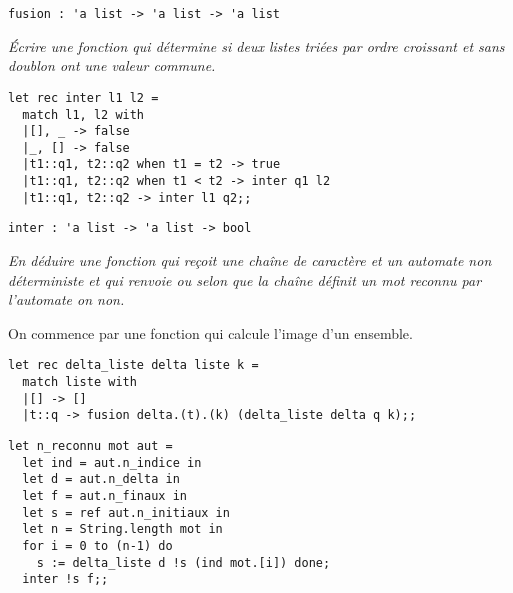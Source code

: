 \begin{lstlisting}
fusion : 'a list -> 'a list -> 'a list
\end{lstlisting}
\begin{Exercise}\it 
Écrire une fonction qui détermine si deux listes triées par ordre croissant et sans doublon ont une valeur commune.
\end{Exercise} 
\begin{Answer}
\begin{lstlisting}
let rec inter l1 l2 =
  match l1, l2 with
  |[], _ -> false
  |_, [] -> false
  |t1::q1, t2::q2 when t1 = t2 -> true
  |t1::q1, t2::q2 when t1 < t2 -> inter q1 l2
  |t1::q1, t2::q2 -> inter l1 q2;;
\end{lstlisting}
\end{Answer} 
\begin{lstlisting}
inter : 'a list -> 'a list -> bool 
\end{lstlisting}
\begin{Exercise}\it 
En déduire une fonction qui reçoit une chaîne de caractère et un automate non déterministe et qui renvoie  ou  selon que la chaîne définit un mot reconnu par l'automate on non.
\end{Exercise} 
\begin{Answer} On commence par une fonction qui calcule l'image d'un ensemble.
\begin{lstlisting}
let rec delta_liste delta liste k =
  match liste with
  |[] -> []
  |t::q -> fusion delta.(t).(k) (delta_liste delta q k);;
\end{lstlisting}

\begin{lstlisting}
let n_reconnu mot aut =
  let ind = aut.n_indice in
  let d = aut.n_delta in
  let f = aut.n_finaux in
  let s = ref aut.n_initiaux in
  let n = String.length mot in
  for i = 0 to (n-1) do
    s := delta_liste d !s (ind mot.[i]) done;
  inter !s f;;
\end{lstlisting}
\end{Answer} 

